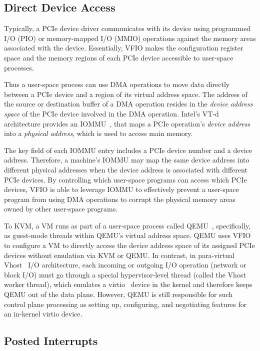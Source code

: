 \subsection{Direct Device Access}
\vspace{-0.05in}
Typically, a PCIe device driver communicates with its device using programmed I/O (PIO) or
memory-mapped I/O (MMIO) operations against the memory areas associated with the device.
Essentially, VFIO makes the configuration register space and the memory regions of
each PCIe device accessible to user-space processes.


Thus a user-space process can use DMA operations to move data directly between a PCIe device and
a region of its virtual address space.
The address of the source or destination buffer of a DMA operation resides in
the {\em device address space} of the PCIe device involved in the DMA operation.
Intel's VT-d architecture provides an IOMMU~\cite{ben:2006}, that maps a
PCIe operation's {\em device address} into a {\em physical address},
which is used to access main memory.

The key field of each IOMMU entry includes a PCIe device number and a device address.
Therefore, a machine's IOMMU may map the same device address into different physical addresses when the device address is associated with different PCIe devices.
By controlling which user-space programs can access which PCIe devices, VFIO is able to leverage IOMMU to effectively prevent a user-space program
from using DMA operations to corrupt the physical memory areas owned by other user-space programs.

To KVM, a VM runs as part of a user-space process  called QEMU~\cite{qemu},
specifically, as guest-mode threads within QEMU's virtual address space.
QEMU uses VFIO to configure a VM to directly access the device address space of
its assigned PCIe devices without emulation via KVM or QEMU.
In contrast, in para-virtual Vhost~\cite{vhost-net} I/O architecture,
each incoming or outgoing I/O operation (network or block I/O) must go through
a special hypervisor-level thread (called the Vhost worker thread),
which emulates a virtio~\cite{russell:2008} device in the kernel and
therefore keeps QEMU out of the data plane.
However, QEMU is still responsible for such control plane processing as setting up,
configuring, and negotiating features for an in-kernel virtio device.


\vspace{-0.1in}
\subsection{Posted Interrupts}
\vspace{-0.05in}

